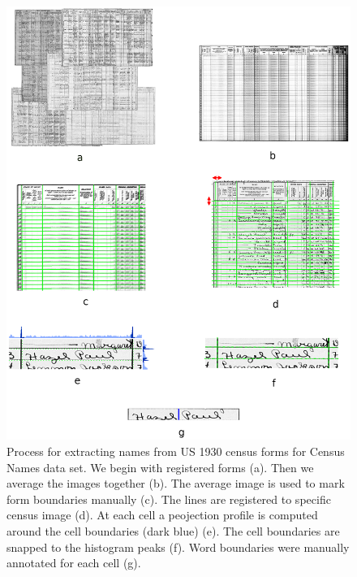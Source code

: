 \documentclass[ms,electronic,twosidetoc,letterpaper,chaptercenter,parttop,lof,lot]{byumsphd}
\begin{document}
\begin{figure}
    \centering
    \includegraphics[width=.9\textwidth]{makenames}
    \caption{Process for extracting names from US 1930 census forms for Census Names data set. We begin with registered forms (a). Then we average the images together (b). The average image is used to mark form boundaries manually (c). The lines are registered to specific census image (d). At each cell a peojection profile is computed around the cell boundaries (dark blue) (e). The cell boundaries are snapped to the histogram peaks (f). Word boundaries were manually annotated for each cell (g).}
    \label{fig:makenames}
\end{figure}
\end{document}
